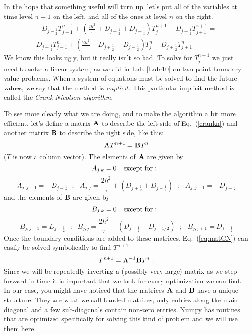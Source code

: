 {In the hope that something useful will turn up, let's put all of the
variables at time level $n+1$ on the left, and all of the ones at
level $n$ on the right.
\begin{multline}
    -D_{j-\frac{1}{2}} T_{j-1}^{n+1} +
    \left( \frac{2h^2}{\tau} + D_{j+\frac{1}{2}}+D_{j-\frac{1}{2}}\right) T_j^{n+1}
    -D_{j+\frac{1}{2}} T_{j+1}^{n+1} = \\
    D_{j-\frac{1}{2}} T_{j-1}^n +
    \left( \frac{2h^2}{\tau} - D_{j+\frac{1}{2}}-D_{j-\frac{1}{2}} \right) T_j^n +
    D_{j+\frac{1}{2}} T_{j+1}^n
    \label{crankn}
\end{multline}
We know this looks ugly, but it really isn't so bad. To solve
for $T_j^{n+1}$ we just need to solve a linear system, as we
did in Lab~\ref{Lab:10} on two-point boundary value problems.
 When a system of equations must be
solved to find the future values, we say that the method is
{\it implicit}. This particular implicit method is called the
{\it Crank-Nicolson algorithm}. 

To see more clearly what we are doing, and to make the algorithm a
bit more efficient, let's define a matrix ${\bf A}$ to describe the
left side of Eq.~(\ref{crankn}) and another matrix ${\bf B}$ to
describe the right side, like this:
\begin{equation}
    {\bf A} T^{n+1} =
    {\bf B} T^n
    \label{eq:matCN}
\end{equation}
($T$ is now a column vector). The elements of ${\bf A}$ are given by
\begin{displaymath}
    A_{j,k}=0~~~{\rm except~for:~~}
\end{displaymath}
\begin{equation}
    A_{j,j-1}=-D_{j-\frac{1}{2} } ~~~;~~~
    A_{j,j}=\frac{2h^2}{\tau} + (D_{j+\frac{1}{2}}+D_{j-\frac{1}{2}} )~~~;~~~
    A_{j,j+1}=-D_{j+\frac{1}{2}}
    \label{eqA}
\end{equation}
and the elements of ${\bf B}$ are given by
\begin{displaymath}
    B_{j,k}=0~~~{\rm except~for:~~}
\end{displaymath}
\begin{equation}
    B_{j,j-1} = D_{j-\frac{1}{2}}  ~~~;~~~
    B_{j,j}=\frac{2h^2}{\tau}-(D_{j+\frac{1}{2}}+D_{j-1/2} ) ~~~;~~~
    B_{j,j+1}= D_{j+\frac{1}{2}}
    \label{eqB}
\end{equation}
Once the boundary conditions are added to these matrices,
Eq.~(\ref{eq:matCN}) can easily be solved symbolically to find
$T^{n+1}$
\begin{equation}
    T^{n+1} = {\bf A}^{-1} {\bf B} T^n ~.
    \label{opadvance}
\end{equation}
Since we will be repeatedly inverting a (possibly very large) matrix
as we step forward in time it is important that we look for every
optimization we can find.  In our case, you might have noticed that
the matrices ${\bf A}$ and ${\bf B}$ have a unique structure. They are
what we call banded matrices; only entries along the main diagonal and
a few sub-diagonals contain non-zero entries.  Numpy has routines that
are optimized specifically for solving this kind of problem and we
will use them here.  

}

